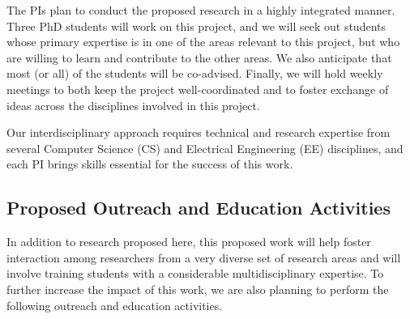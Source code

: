 \documentclass[11 pt]{article}
\begin{document}
The PIs plan to conduct the proposed research in a highly integrated manner.
Three PhD students will work on this project, and we will seek out students
whose primary expertise is in one of the areas relevant to this project,
but who are willing to learn and contribute to the other areas. We also
anticipate that most (or all) of the students will be co-advised. Finally,
we will hold weekly meetings to both keep the project well-coordinated and
to foster exchange of ideas across the disciplines involved in this project.

Our interdisciplinary approach requires technical and research
expertise from several Computer Science (CS) and Electrical Engineering (EE) disciplines, and each PI brings skills essential for the success of this work.

\subsection{Proposed Outreach and Education Activities}

In addition to research proposed here, this proposed work will help foster interaction among researchers from a
very diverse set of research areas and will involve training students
with a considerable multidisciplinary expertise. To further increase
the impact of this work, we are also planning to perform the following
outreach and education activities.
\end{document}
